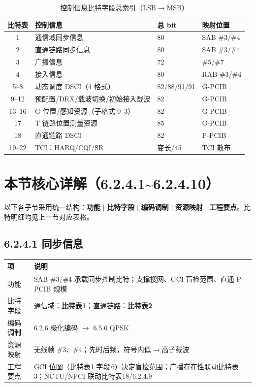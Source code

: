 \documentclass[11pt,a4paper]{ctexart}
\begin{document}
\begin{table}[h]
\centering
\small
\caption{控制信息比特字段总索引（LSB$\rightarrow$MSB）}
\begin{tabular}{clll}
\toprule
\textbf{比特表} & \textbf{控制信息} & \textbf{总 bit} & \textbf{映射位置} \\
\midrule
1 & 通信域同步信息 & 80 & SAB \#3/\#4 \\
2 & 直通链路同步信息 & 80 & SAB \#3/\#4 \\
3 & 广播信息 & 72 & \#5/\#7 \\
4 & 接入信息 & 80 & RAB \#3/\#4 \\
5--8 & 动态调度 DSCI（4 格式） & 82/88/91/91 & G-PCIB \\
9--12 & 预配置/DRX/载波切换/初始接入载波 & 82 & G-PCIB \\
13--16 & G 位置/感知资源（子格式 0--3） & 82 & G-PCIB \\
17 & T 链路位置测量资源 & 85 & G-PCIB \\
18 & 直通链路 DSCI & 82 & P-PCIB \\
19--22 & TCI：HARQ/CQI/SR & 变长/45 & TCI 散布 \\
\bottomrule
\end{tabular}
\end{table}



\section{本节核心详解（6.2.4.1\textasciitilde 6.2.4.10）}

\noindent 以下各子节采用统一结构：\textbf{功能} $\mid$ \textbf{比特字段} $\mid$ \textbf{编码调制} $\mid$ \textbf{资源映射} $\mid$ \textbf{工程要点}。比特明细均见上一节对应表格。

\subsection{6.2.4.1 同步信息}

\begin{table}[h]
\centering
\small
\begin{tabular}{L{2.2cm}L{10.8cm}}
\toprule
\textbf{项} & \textbf{说明} \\
\midrule
功能 & SAB \#3/\#4 承载同步控制比特；支撑搜网、GCI 盲检范围、直通 P-PCIB 规模 \\
比特字段 & 通信域：\textbf{比特表1}；直通链路：\textbf{比特表2} \\
编码调制 & 6.2.6 极化编码 $\rightarrow$ 6.5.6 QPSK \\
资源映射 & 无线帧 \#3、\#4；先时后频，符号内低$\rightarrow$高子载波 \\
工程要点 & GCI 位图（比特表1 字段\,6）决定盲检范围；广播存在性联动比特表3；NCTU/NPCI 联动比特表18/6.2.4.9 \\
\bottomrule
\end{tabular}
\end{table}
\end{document}
